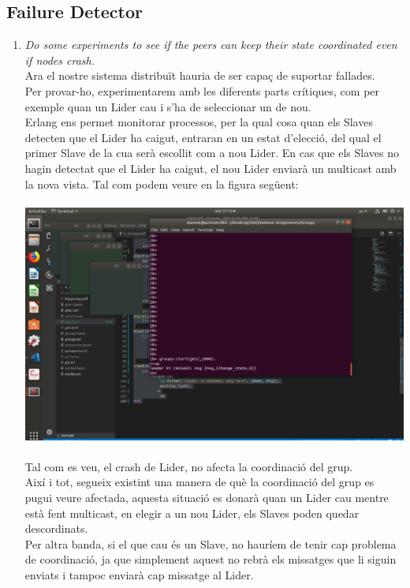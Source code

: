 \documentclass[a4paper, 10pt]{article}
\begin{document}
\subsection{Failure Detector}
\begin{enumerate}
    \item\textit{Do some experiments to see if the peers can keep their
state coordinated even if nodes crash.}\\Ara el nostre sistema distribuït hauria de ser capaç de suportar fallades.\\
Per provar-ho, experimentarem amb les diferents parts crítiques, com per exemple quan un Lider cau i s'ha de seleccionar un de nou.\\
Erlang ens permet monitorar processos, per la qual cosa quan els Slaves detecten que el Lider ha caigut, entraran en un estat d'elecció, del qual el primer Slave de la cua serà escollit com a nou Lider. En cas que els Slaves no hagin detectat que el Lider ha caigut, el nou Lider enviarà un multicast amb la nova vista. Tal com podem veure en la figura següent:\\\\
    \includegraphics[width=\textwidth]{img4.png}\\\\
    Tal com es veu, el crash de Lider, no  afecta la coordinació del grup.\\
Així i tot, segueix existint una manera de què la coordinació del grup es pugui veure afectada, aquesta situació es donarà quan un Lider cau mentre està fent multicast, en elegir a un nou Lider, els Slaves poden quedar descordinats.\\
Per altra banda, si el que cau és un Slave, no hauríem de tenir cap problema de coordinació, ja que simplement aquest no rebrà els missatges que li siguin enviats i tampoc enviarà cap missatge al Lider.
\end{enumerate}
\end{document}
